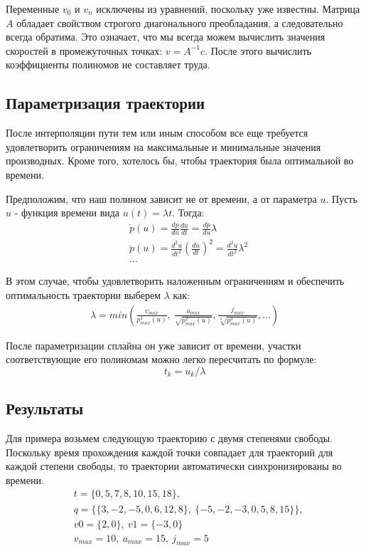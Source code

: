 Переменные $v_{0}$ и $v_{n}$ исключены из уравнений, поскольку уже известны. Матрица $A$ обладает свойством строгого диагонального преобладания\cite{DDMWiki}, а следовательно всегда обратима. Это означает, что мы всегда можем вычислить значения скоростей в промежуточных точках: $v = A^{-1}c$. После этого вычислить коэффициенты полиномов не составляет труда.


\subsection{Параметризация траектории} \label{subsect5_2_2}
После интерполяции пути тем или иным способом все еще требуется удовлетворить ограничениям на максимальные и минимальные значения производных. Кроме того, хотелось бы, чтобы траектория была оптимальной во времени.

Предположим, что наш полином зависит не от времени, а от параметра $u$. Пусть $u$ - функция времени вида $u(t) = \lambda t$. Тогда:
\begin{align*}
	&\dot{p}(u) = \frac{dp}{du}\frac{du}{dt} = \frac{dp}{du}\lambda \\
	&\ddot{p}(u) = \frac{d^{2}u}{dt^{2}}(\frac{du}{dt})^{2} = \frac{d^{2}u}{dt^{2}}\lambda^{2}\\
	&\dotso
\end{align*}

В этом случае, чтобы удовлетворить наложенным ограничениям и обеспечить оптимальность траектории выберем $\lambda$ как:
\begin{align*}
	\lambda = min(\frac{v_{max}}{p_{max}^{1}(u)},\ \frac{a_{max}}{\sqrt{p_{max}^{2}(u)}}, \frac{j_{max}}{\sqrt[3]{p_{max}^{3}(u)}}, \dots)   
\end{align*}

После параметризации сплайна он уже зависит от времени, участки соответствующие его полиномам можно легко пересчитать по формуле:
\[
	t_{k} = u_{k} / \lambda
\]

\subsection{Результаты} \label{subsect5_2_3}
Для примера возьмем следующую траекторию с двумя степенями свободы. Поскольку время прохождения каждой точки совпадает для траекторий для каждой степени свободы, то траектории автоматически синхронизированы во времени.
\begin{align*}
	&t = \{0, 5, 7, 8, 10, 15, 18\},\\
	&q = \{\{3, -2, -5, 0, 6, 12, 8\},\ \{-5, -2, -3, 0, 5, 8, 15\}\},\\
	&v0 = \{2, 0\},\ v1 = \{-3, 0\}\\
	&v_{max} = 10,\ a_{max} = 15,\ j_{max} = 5
\end{align*}

